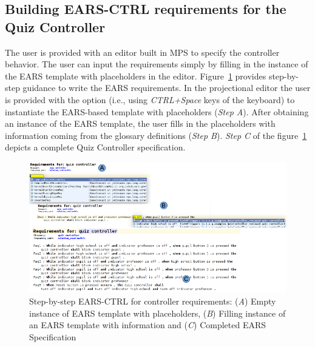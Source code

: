 \subsection{Building \textsf{EARS-CTRL} requirements for the Quiz Controller}
\vspace{-.2cm}
The user is provided with an editor built in MPS \cite{mps} to specify the
controller behavior. The user can input the requirements simply by filling in
the instance of the EARS template with placeholders in the editor.
Figure~\ref{fig:EARS_req} provides step-by-step guidance to write the EARS
requirements. In the projectional editor the user is provided with the option
(i.e., using \emph{CTRL+Space} keys of the keyboard) to instantiate the
EARS-based template with placeholders (\emph{Step A}). After obtaining an
instance of the EARS template, the user fills in the placeholders with
information coming from the glossary definitions (\emph{Step B}). \emph{Step C}
of the figure~\ref{fig:EARS_req} depicts a complete Quiz Controller specification.
\begin{figure}[!h]
\centering
\includegraphics[width=1.2\textwidth]{./images/Req_Spec_Steps.png}
\caption{Step-by-step \textsf{EARS-CTRL} for controller requirements: (\emph{A})
Empty instance of EARS template with placeholders, (\emph{B}) Filling instance of an EARS
template with information and (\emph{C}) Completed EARS Specification }
\label{fig:EARS_req}
\end{figure}
\vspace{-.2cm}
